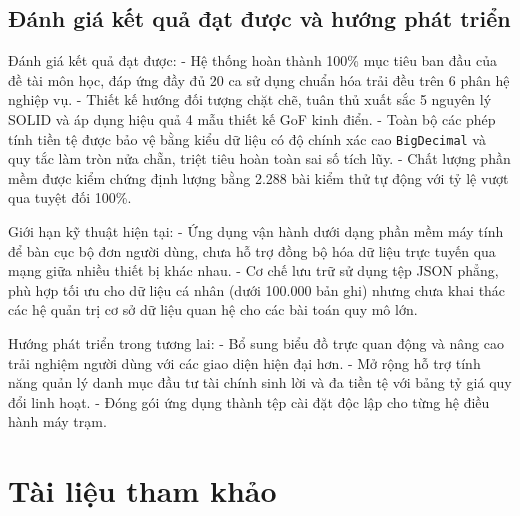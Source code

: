 \documentclass[a4paper,12pt]{report}
\newcommand{\passthrough}[1]{#1}
\begin{document}
\section{Đánh giá kết quả đạt được và hướng phát
triển}\label{ux111uxe1nh-giuxe1-kux1ebft-quux1ea3-ux111ux1ea1t-ux111ux1b0ux1ee3c-vuxe0-hux1b0ux1edbng-phuxe1t-triux1ec3n}

Đánh giá kết quả đạt được: - Hệ thống hoàn thành 100\% mục tiêu ban đầu
của đề tài môn học, đáp ứng đầy đủ 20 ca sử dụng chuẩn hóa trải đều trên
6 phân hệ nghiệp vụ. - Thiết kế hướng đối tượng chặt chẽ, tuân thủ xuất
sắc 5 nguyên lý SOLID và áp dụng hiệu quả 4 mẫu thiết kế GoF kinh điển.
- Toàn bộ các phép tính tiền tệ được bảo vệ bằng kiểu dữ liệu có độ
chính xác cao \passthrough{\lstinline!BigDecimal!} và quy tắc làm tròn
nửa chẵn, triệt tiêu hoàn toàn sai số tích lũy. - Chất lượng phần mềm
được kiểm chứng định lượng bằng 2.288 bài kiểm thử tự động với tỷ lệ
vượt qua tuyệt đối 100\%.

Giới hạn kỹ thuật hiện tại: - Ứng dụng vận hành dưới dạng phần mềm máy
tính để bàn cục bộ đơn người dùng, chưa hỗ trợ đồng bộ hóa dữ liệu trực
tuyến qua mạng giữa nhiều thiết bị khác nhau. - Cơ chế lưu trữ sử dụng
tệp JSON phẳng, phù hợp tối ưu cho dữ liệu cá nhân (dưới 100.000 bản
ghi) nhưng chưa khai thác các hệ quản trị cơ sở dữ liệu quan hệ cho các
bài toán quy mô lớn.

Hướng phát triển trong tương lai: - Bổ sung biểu đồ trực quan động và
nâng cao trải nghiệm người dùng với các giao diện hiện đại hơn. - Mở
rộng hỗ trợ tính năng quản lý danh mục đầu tư tài chính sinh lời và đa
tiền tệ với bảng tỷ giá quy đổi linh hoạt. - Đóng gói ứng dụng thành tệp
cài đặt độc lập cho từng hệ điều hành máy trạm.

\chapter{Tài liệu tham khảo}\label{tuxe0i-liux1ec7u-tham-khux1ea3o}
\end{document}
